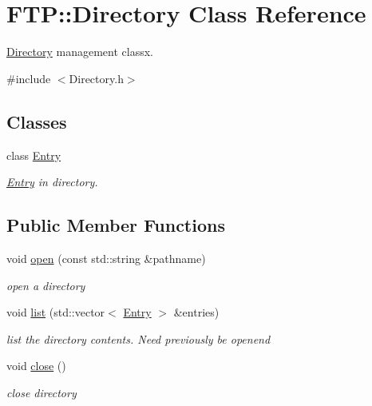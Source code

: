 \hypertarget{class_f_t_p_1_1_directory}{\section{F\-T\-P\-:\-:Directory Class Reference}
\label{class_f_t_p_1_1_directory}
}


\hyperlink{class_f_t_p_1_1_directory}{Directory} management classx.  




{\ttfamily \#include $<$Directory.\-h$>$}

\subsection*{Classes}
\begin{DoxyCompactItemize}
\item 
class \hyperlink{struct_f_t_p_1_1_directory_1_1_entry}{Entry}
\begin{DoxyCompactList}\small\item\em \hyperlink{struct_f_t_p_1_1_directory_1_1_entry}{Entry} in directory. \end{DoxyCompactList}\end{DoxyCompactItemize}
\subsection*{Public Member Functions}
\begin{DoxyCompactItemize}
\item 
void \hyperlink{class_f_t_p_1_1_directory_a54da7630bdd8e0c5f45c7bb56cb29d9b}{open} (const std\-::string \&pathname)
\begin{DoxyCompactList}\small\item\em open a directory \end{DoxyCompactList}\item 
void \hyperlink{class_f_t_p_1_1_directory_a2030a6e209fbe90537db216839eb6c75}{list} (std\-::vector$<$ \hyperlink{struct_f_t_p_1_1_directory_1_1_entry}{Entry} $>$ \&entries)
\begin{DoxyCompactList}\small\item\em list the directory contents. Need previously be openend \end{DoxyCompactList}\item 
\hypertarget{class_f_t_p_1_1_directory_abb5502a657390ea09207d51494213b27}{void \hyperlink{class_f_t_p_1_1_directory_abb5502a657390ea09207d51494213b27}{close} ()}\label{class_f_t_p_1_1_directory_abb5502a657390ea09207d51494213b27}

\begin{DoxyCompactList}\small\item\em close directory \end{DoxyCompactList}\end{DoxyCompactItemize}


